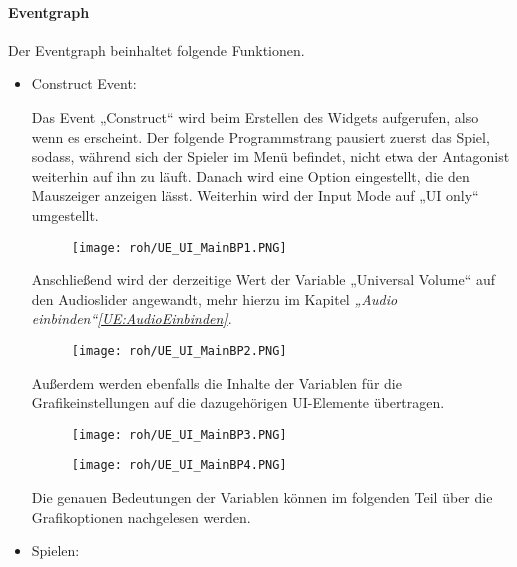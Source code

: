 \paragraph{Eventgraph}
Der Eventgraph beinhaltet folgende Funktionen.
\begin{itemize}
    \item Construct Event:

    Das Event „Construct“ wird beim Erstellen des Widgets aufgerufen, also wenn es erscheint. Der folgende Programmstrang pausiert zuerst das Spiel, sodass, während sich der Spieler im Menü befindet, nicht etwa der Antagonist weiterhin auf ihn zu läuft. Danach wird eine Option eingestellt, die den Mauszeiger anzeigen lässt. Weiterhin wird der Input Mode auf „UI only“ umgestellt.
    \begin{figure}[H]
        \centering
        \texttt{[image: roh/UE\_UI\_MainBP1.PNG]}
        \label{UE:UI_MainBP1}
    \end{figure}
    Anschließend wird der derzeitige Wert der Variable „Universal Volume“ auf den Audioslider angewandt, mehr hierzu im Kapitel \textit{„Audio einbinden“\ref{UE:AudioEinbinden}}.
    \begin{figure}[H]
        \centering
        \texttt{[image: roh/UE\_UI\_MainBP2.PNG]}
        \label{UE:UI_MainBP2}
    \end{figure}
    Außerdem werden ebenfalls die Inhalte der Variablen für die Grafikeinstellungen auf die dazugehörigen UI-Elemente übertragen.
    \begin{figure}[H]
        \centering
        \texttt{[image: roh/UE\_UI\_MainBP3.PNG]}
        \label{UE:UI_MainBP3_4_1}
    \end{figure}

    \begin{figure}[H]
        \centering
        \texttt{[image: roh/UE\_UI\_MainBP4.PNG]}
        \label{UE:UI_MainBP3_4_2}
    \end{figure}
    Die genauen Bedeutungen der Variablen können im folgenden Teil über die Grafikoptionen nachgelesen werden.
    \item Spielen:


\end{itemize}
